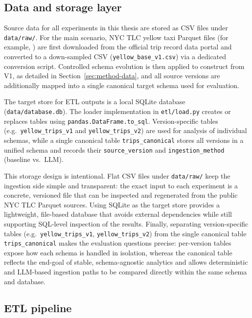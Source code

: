 \subsection{Data and storage layer}

Source data for all experiments in this thesis are stored as CSV files under
\texttt{data/raw/}. For the main scenario, NYC TLC yellow taxi Parquet files
(for example, ) are first downloaded
from the official trip record data portal and converted to a down-sampled CSV
(\texttt{yellow\_base\_v1.csv}) via a dedicated conversion script. Controlled
schema evolution is then applied to construct 
from V1, as detailed in Section~\ref{sec:method-data}, and all source versions
are additionally mapped into a single canonical target schema used for
evaluation.

The target store for ETL outputs is a local SQLite database
(\texttt{data/database.db}). The loader implementation in
\texttt{etl/load.py} creates or replaces tables using
\texttt{pandas.DataFrame.to\_sql}. Version-specific tables (e.g.\
\texttt{yellow\_trips\_v1} and \texttt{yellow\_trips\_v2})
are used for analysis of individual schemas, while a single canonical table
\texttt{trips\_canonical} stores all versions in a unified schema and records
their \texttt{source\_version} and \texttt{ingestion\_method} (baseline vs.\ LLM).

This storage design is intentional. Flat CSV files under \texttt{data/raw/} keep the ingestion side simple and transparent: the exact input to each experiment is a concrete, versioned file that can be inspected and regenerated from the public NYC TLC Parquet sources. Using SQLite as the target store provides a lightweight, file-based database that avoids external dependencies while still supporting SQL-level inspection of the results. Finally, separating version-specific tables (e.g.\ \texttt{yellow\_trips\_v1}, \texttt{yellow\_trips\_v2}) from the single canonical table \texttt{trips\_canonical} makes the evaluation questions precise: per-version tables expose how each schema is handled in isolation, whereas the canonical table reflects the end-goal of stable, schema-agnostic analytics and allows deterministic and LLM-based ingestion paths to be compared directly within the same schema and database.

\subsection{ETL pipeline}


